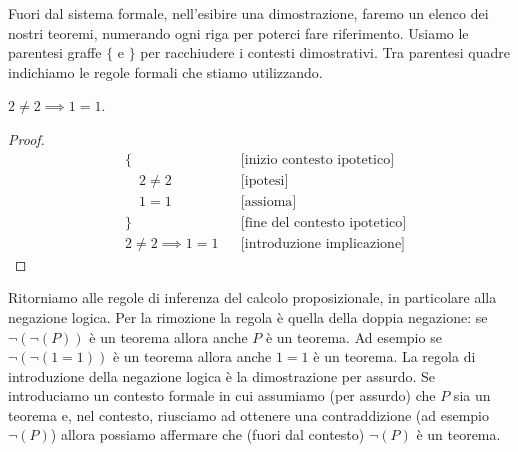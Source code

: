 Fuori dal sistema formale, nell'esibire una dimostrazione,
faremo un elenco dei nostri teoremi, numerando ogni riga 
per poterci fare riferimento. 
Usiamo le parentesi graffe $\{$ e $\}$ per racchiudere 
i contesti dimostrativi. 
Tra parentesi quadre indichiamo le regole formali che stiamo 
utilizzando. 
\begin{theorem}
  $2 \neq 2 \implies 1=1$.
\end{theorem}
%  
\begin{proof}
  \begin{align}
    &\{ & &\text{[inizio contesto ipotetico]} \\ 
    &\quad 2\neq 2 & & \text{[ipotesi]}  \\
    &\quad 1=1 & & \text{[assioma]} \\
    &\} & & \text{[fine del contesto ipotetico]} \\
    &2\neq 2 \implies 1=1 & & \text{[introduzione implicazione]}
  \end{align}
\end{proof}


Ritorniamo alle regole di inferenza del calcolo proposizionale,
in particolare alla negazione logica. 
%
%
Per la rimozione la regola è quella della doppia negazione: 
se $\lnot (\lnot (P))$ è un teorema allora anche $P$ è un teorema.
Ad esempio se $\lnot (\lnot (1=1))$ è un teorema allora anche $1=1$ 
è un teorema.
%
La regola di introduzione della negazione logica è la 
dimostrazione per assurdo.
%
%
Se introduciamo un contesto formale in cui assumiamo (per assurdo)
che $P$ sia un teorema e, nel contesto, riusciamo ad ottenere 
una contraddizione (ad esempio $\lnot (P)$) allora possiamo 
affermare che (fuori dal contesto) $\lnot (P)$ è un teorema.

